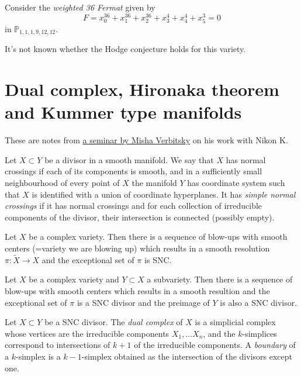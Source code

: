 \begin{example}
\label{example-weighted-36-fermat}
Consider the {\it weighted 36 Fermat} 
given by
$$
F=x_0^{36}+x_1^{36}+x_2^{36}+x_3^4
+x_4^4+x_5^3=0
$$
in $\mathbb{P}_{1,1,1,9,12,12}$.

It's not known whether the Hodge conjecture
holds for this variety.
\end{example}

\section{Dual complex, Hironaka theorem and Kummer type manifolds}
\label{section-dual-complex-hironaka-kummer-type-manifolds}

\noindent
These are notes from 
\href{http://verbit.ru/MATH/TALKS/Dual-complex-ddc_IMPA-2026.pdf}{
a seminar by Misha Verbitsky}
on his work with Nikon K.

\begin{definition}
\label{definition-snc}
Let $X \subset Y$ be a divisor in a smooth manifold.
We say that $X$ has normal crossings if
each of its components is smooth, and in a sufficiently
small neighbourhood of every point of $X$ the manifold
 $Y$ has coordinate system such that $X$ is identified with a union of
coordinate hyperplanes.
It has {\it simple normal crossings} if it has normal crossings and 
for each collection of irreducible components of the divisor,
their intersection is connected (possibly empty).
\end{definition}

\begin{theorem}
\label{theorem-hironaka}
Let $X$ be a complex variety.
Then there is a sequence of blow-ups with
smooth centers (=variety we are blowing up)
which results in a smooth resolution
$\pi:\tilde{X} \to X$ and the exceptional set of $\pi$ is SNC.
\end{theorem}

\begin{theorem}
\label{theorem-hironaka-pair}
Let $X$ be a complex variety and $Y \subset X$ a subvariety.
Then there is a sequence of blow-ups with smooth centers
which results in a smooth resultion
and the exceptional set of $\pi$ is a SNC divisor
and the preimage of $Y$ is also a SNC divisor.
\end{theorem}

\begin{definition}[Stepanov, 2004]
\label{definition-dual-complex}
Let $X \subset Y$ be a SNC divisor.
The {\it dual complex} of $X$ is a simplicial complex
whose vertices are the irreducible components $X_1,…X_n$,
and the $k$-simplices correspond to
intersections of $k+1$ of the irreducible components.
A {\it boundary} of a $k$-simplex is a $k-1$-simplex
obtained as the intersection of the divisors except one.
\end{definition}

